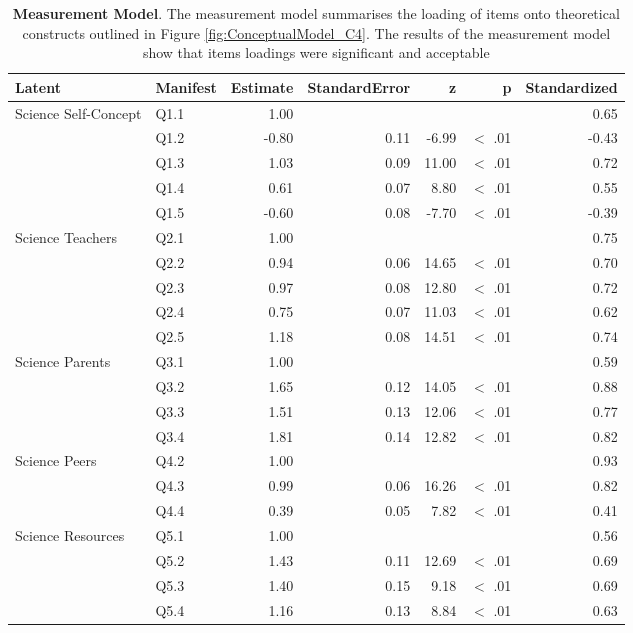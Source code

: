 \begin{landscape}
\begin{table}[ht]
\centering
\begin{tabular}{llrrrrr}
  \hline
Latent & Manifest & Estimate & StandardError & z & p & Standardized \\ 
  \hline
Science Self-Concept & Q1.1 & 1.00 &  &  &  & 0.65 \\ 
   & Q1.2 & -0.80 & 0.11 & -6.99 & $<$ .01 & -0.43 \\ 
   & Q1.3 & 1.03 & 0.09 & 11.00 & $<$ .01 & 0.72 \\ 
   & Q1.4 & 0.61 & 0.07 & 8.80 & $<$ .01 & 0.55 \\ 
   & Q1.5 & -0.60 & 0.08 & -7.70 & $<$ .01 & -0.39 \\ 
  Science Teachers & Q2.1 & 1.00 &  &  &  & 0.75 \\ 
   & Q2.2 & 0.94 & 0.06 & 14.65 & $<$ .01 & 0.70 \\ 
   & Q2.3 & 0.97 & 0.08 & 12.80 & $<$ .01 & 0.72 \\ 
   & Q2.4 & 0.75 & 0.07 & 11.03 & $<$ .01 & 0.62 \\ 
   & Q2.5 & 1.18 & 0.08 & 14.51 & $<$ .01 & 0.74 \\ 
  Science Parents & Q3.1 & 1.00 &  &  &  & 0.59 \\ 
   & Q3.2 & 1.65 & 0.12 & 14.05 & $<$ .01 & 0.88 \\ 
   & Q3.3 & 1.51 & 0.13 & 12.06 & $<$ .01 & 0.77 \\ 
   & Q3.4 & 1.81 & 0.14 & 12.82 & $<$ .01 & 0.82 \\ 
  Science Peers & Q4.2 & 1.00 &  &  &  & 0.93 \\ 
   & Q4.3 & 0.99 & 0.06 & 16.26 & $<$ .01 & 0.82 \\ 
   & Q4.4 & 0.39 & 0.05 & 7.82 & $<$ .01 & 0.41 \\ 
  Science Resources & Q5.1 & 1.00 &  &  &  & 0.56 \\ 
   & Q5.2 & 1.43 & 0.11 & 12.69 & $<$ .01 & 0.69 \\ 
   & Q5.3 & 1.40 & 0.15 & 9.18 & $<$ .01 & 0.69 \\ 
   & Q5.4 & 1.16 & 0.13 & 8.84 & $<$ .01 & 0.63 \\ 
   \hline
\end{tabular}
\caption{\textbf{Measurement Model}. The measurement model summarises the loading of items onto theoretical constructs outlined in Figure \ref{fig:ConceptualModel_C4}. The results of the measurement model show that items loadings were significant and acceptable}
\label{tab:MeasurementModel}       %
\end{table}
\end{landscape}


